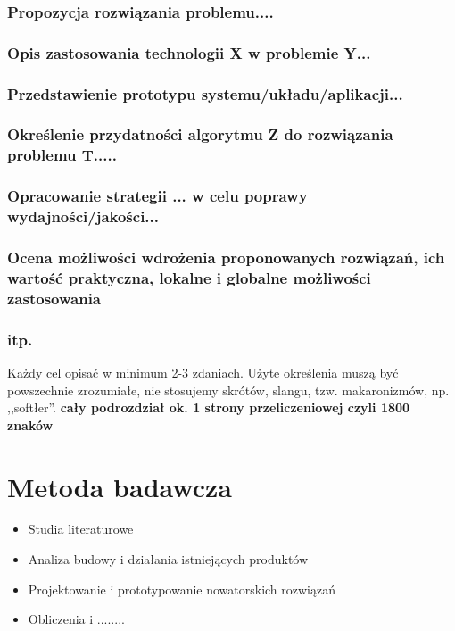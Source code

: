 \documentclass[12pt]{report}
\begin{document}
\subsubsection{Propozycja rozwiązania problemu....}
\subsubsection{Opis zastosowania technologii X w problemie Y...}
\subsubsection{Przedstawienie prototypu systemu/układu/aplikacji...}
\subsubsection{Określenie przydatności algorytmu Z do rozwiązania problemu T.....
}
\subsubsection{Opracowanie strategii ... w celu poprawy wydajności/jakości...}
\subsubsection{Ocena możliwości wdrożenia proponowanych rozwiązań, ich wartość
praktyczna, lokalne i globalne możliwości zastosowania}
\subsubsection{itp.}

Każdy cel opisać w minimum 2-3 zdaniach. Użyte określenia muszą być powszechnie
zrozumiałe, nie stosujemy skrótów, slangu,  tzw. makaronizmów, np. ,,softłer''.
{\bf cały podrozdział ok. 1 strony przeliczeniowej czyli 1800 znaków}

\section{Metoda badawcza}
\begin{itemize}
\item Studia literaturowe
\item Analiza budowy i działania istniejących produktów
\item Projektowanie i prototypowanie nowatorskich rozwiązań 
\item Obliczenia i ........
\end{itemize}
\end{document}
